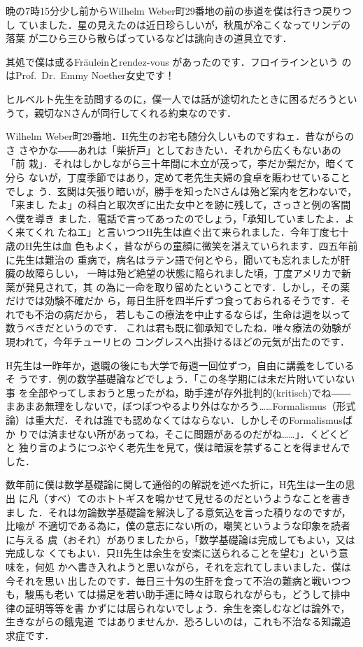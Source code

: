 \documentclass{ltjsarticle}
\begin{document}
晩の7時15分少し前からWilhelm Weber町29番地の前の歩道を僕は行きつ戻りつし
ていました．星の見えたのは近日珍らしいが，秋風が冷こくなってリンデの落葉
が二ひら三ひら散らばっているなどは誂向きの道具立です．

其処で僕は或るFr\"auleinとrendez-vous があったのです．フロイラインという
のはProf.\ Dr.\ Emmy Noether女史です！

ヒルベルト先生を訪問するのに，僕一人では話が途切れたときに困るだろうとい
うて，親切なNさんが同行してくれる約束なのです．

Wilhelm Weber町29番地．H先生のお宅も随分久しいものですねェ．昔ながらのさ
さやかな――あれは「柴折戸」としておきたい．それから広くもないあの「前
栽」．それはしかしながら三十年間に木立が茂って，李だか梨だか，暗くて分ら
ないが，丁度季節ではあり，定めて老先生夫婦の食卓を賑わせていることでしょ
う．玄関は矢張り暗いが，勝手を知ったNさんは殆ど案内を乞わないで，「来まし
たよ」の科白と取次ぎに出た女中とを跡に残して，さっさと例の客間へ僕を導き
ました．電話で言ってあったのでしょう，「承知していましたよ．よく来てくれ
たねエ」と言いつつH先生は直ぐ出て来られました．今年丁度七十歳のH先生は血
色もよく，昔ながらの童顔に微笑を湛えていられます．四五年前に先生は難治の
重病で，病名はラテン語で何とやら，聞いても忘れましたが肝臓の故障らしい，
一時は殆ど絶望の状態に陥られました頃，丁度アメリカで新薬が発見されて，其
の為に一命を取り留めたということです．しかし，その薬だけでは効験不確だか
ら，毎日生肝を四半斤ずつ食っておられるそうです．それでも不治の病だから，
若しもこの療法を中止するならば，生命は週を以って数うべきだというのです．
これは君も既に御承知でしたね．唯々療法の効験が現われて，今年チューリヒの
コングレスへ出掛けるほどの元気が出たのです．

H先生は一昨年か，退職の後にも大学で毎週一回位ずつ，自由に講義をしているそ
うです．例の数学基礎論などでしょう．「この冬学期には未だ片附いていない事
を全部やってしまおうと思ったがね，助手達が存外批判的(kritisch)でね――
まあまあ無理をしないで，ぼつぼつやるより外はなかろう……Formalismus（形式
論）は重大だ．それは誰でも認めなくてはならない．しかしそのFormalismusばか
りでは済ませない所があってね，そこに問題があるのだがね……」．くどくどと
独り言のようにつぶやく老先生を見て，僕は暗涙を禁ずることを得ませんでした．

数年前に僕は数学基礎論に関して通俗的の解説を述べた折に，H先生は一生の思出
に凡（すべ）てのホトトギスを鳴かせて見せるのだというようなことを書きまし
た．それは勿論数学基礎論を解決し了る意気込を言った積りなのですが，比喩が
不適切である為に，僕の意志にない所の，嘲笑というような印象を読者に与える
虞（おそれ）がありましたから，「数学基礎論は完成してもよい，又は完成しな
くてもよい．只H先生は余生を安楽に送られることを望む」という意味を，何処
かへ書き入れようと思いながら，それを忘れてしまいました．僕は今それを思い
出したのです．毎日三十匁の生肝を食って不治の難病と戦いつつも，駿馬も老い
ては揚足を若い助手連に時々は取られながらも，どうして排中律の証明等等を書
かずには居られないでしょう．余生を楽しむなどは論外で，生きながらの餓鬼道
ではありませんか．恐ろしいのは，これも不治なる知識追求症です．
\end{document}
